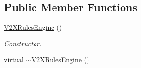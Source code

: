 \subsection*{Public Member Functions}
\begin{DoxyCompactItemize}
\item 
\hyperlink{classV2XRulesEngine_a466a78b6a3d57135ee850327de70ee67}{V2\+X\+Rules\+Engine} ()\hypertarget{classV2XRulesEngine_a466a78b6a3d57135ee850327de70ee67}{}\label{classV2XRulesEngine_a466a78b6a3d57135ee850327de70ee67}

\begin{DoxyCompactList}\small\item\em Constructor. \end{DoxyCompactList}\item 
virtual \hyperlink{classV2XRulesEngine_a3a4736838c9d168c6d4b46ad06729b34}{$\sim$\+V2\+X\+Rules\+Engine} ()\hypertarget{classV2XRulesEngine_a3a4736838c9d168c6d4b46ad06729b34}{}\label{classV2XRulesEngine_a3a4736838c9d168c6d4b46ad06729b34}


\end{DoxyCompactItemize}
